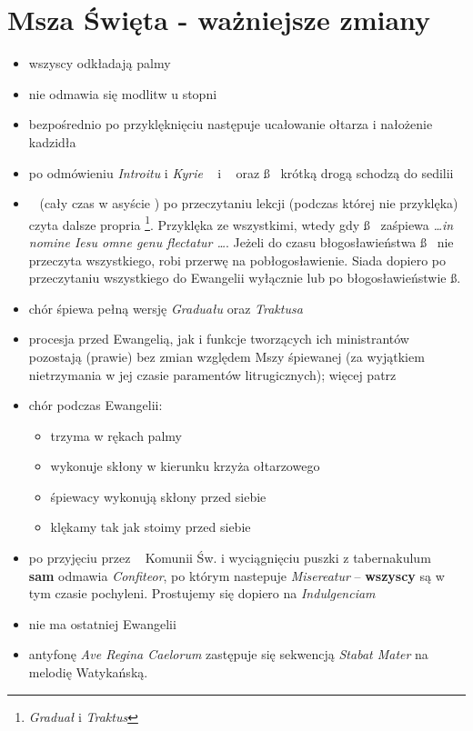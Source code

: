 \section{Msza Święta - ważniejsze zmiany}
\begin{itemize}
	\item wszyscy odkładają palmy
	\item nie odmawia się modlitw u stopni
	\item bezpośrednio po przyklęknięciu następuje ucałowanie ołtarza i
	      nałożenie kadzidła
	\item po odmówieniu \textit{Introitu} i \textit{Kyrie} \ii~ i \dd~ oraz \ss~
	      krótką drogą schodzą do sedilii
	\item \ii~ (cały czas w asyście \dd) po przeczytaniu lekcji (podczas której
	      nie przyklęka) czyta dalsze propria \footnote{\textit{Graduał} i
		      \textit{Traktus}}. Przyklęka ze wszystkimi, wtedy gdy \ss~ zaśpiewa
	      \textit{\dots in nomine Iesu omne genu flectatur \dots}. Jeżeli do
	      czasu błogosławieństwa \ss~ nie przeczyta wszystkiego, robi przerwę na
	      pobłogosławienie. Siada dopiero po przeczytaniu wszystkiego do
	      Ewangelii wyłącznie lub po błogosławieństwie \ss.
	\item chór śpiewa pełną wersję \textit{Graduału} oraz  \textit{Traktusa}
	\item procesja przed Ewangelią, jak i funkcje tworzących ich ministrantów
	      pozostają (prawie) bez zmian względem Mszy śpiewanej (za wyjątkiem
	      nietrzymania w jej czasie paramentów litrugicznych); więcej patrz
	      \textit{}
	\item chór podczas Ewangelii:

	      \begin{itemize}
		      \item trzyma w rękach palmy
		      \item wykonuje skłony w kierunku krzyża ołtarzowego
		      \item śpiewacy wykonują skłony przed siebie
		      \item klękamy tak jak stoimy przed siebie
		  \end{itemize}
		  
	\item po przyjęciu przez \ii~ Komunii Św. i wyciągnięciu puszki z
	      tabernakulum \dd~ \textbf{sam} odmawia \textit{Confiteor}, po którym
	      nastepuje \textit{Misereatur} -- \textbf{wszyscy} są w tym czasie
	      pochyleni. Prostujemy się dopiero na \textit{Indulgenciam}
	\item nie ma ostatniej Ewangelii
	\item antyfonę \textit{Ave Regina Caelorum} zastępuje się sekwencją
	      \textit{Stabat Mater} na melodię Watykańską.

\end{itemize}